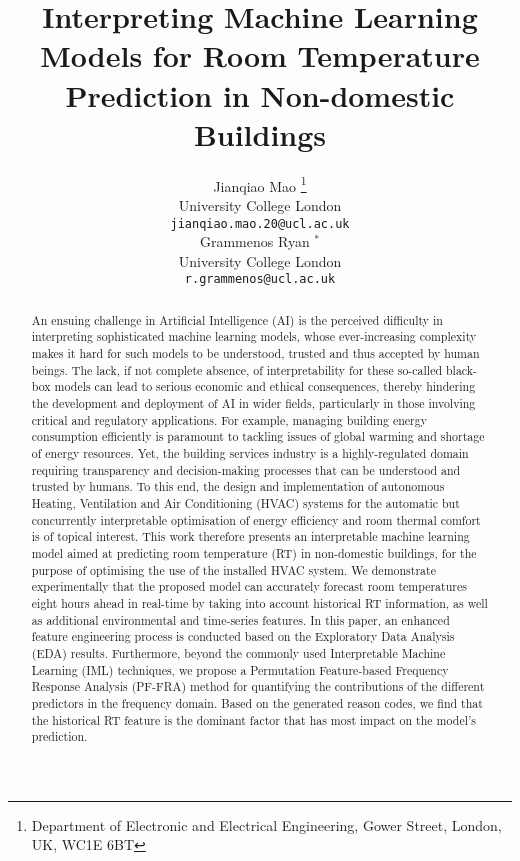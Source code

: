 \documentclass[11pt]{article}
\title{Interpreting Machine Learning Models for Room Temperature Prediction in Non-domestic Buildings}
\author{ {Jianqiao Mao} 
        \thanks{Department of Electronic and Electrical Engineering, Gower Street, London, UK, WC1E 6BT} \\
	University College London \\
	\texttt{jianqiao.mao.20@ucl.ac.uk} \\
	\And
    {Grammenos Ryan $^*$} \\
	University College London\\
	\texttt{r.grammenos@ucl.ac.uk} \\
}
\date{}
\begin{document}
\maketitle

\begin{abstract}
An ensuing challenge in Artificial Intelligence (AI) is the perceived difficulty in interpreting sophisticated machine learning models, whose ever-increasing complexity makes it hard for such models to be understood, trusted and thus accepted by human beings. The lack, if not complete absence, of interpretability for these so-called black-box models can lead to serious economic and ethical consequences, thereby hindering the development and deployment of AI in wider fields, particularly in those involving critical and regulatory applications. For example, managing building energy consumption efficiently is paramount to tackling issues of global warming and shortage of energy resources. Yet, the building services industry is a highly-regulated domain requiring transparency and decision-making processes that can be understood and trusted by humans. To this end, the design and implementation of autonomous Heating, Ventilation and Air Conditioning (HVAC) systems for the automatic but concurrently interpretable optimisation of energy efficiency and room thermal comfort is of topical interest. This work therefore presents an interpretable machine learning model aimed at predicting room temperature (RT) in non-domestic buildings, for the purpose of optimising the use of the installed HVAC system. We demonstrate experimentally that the proposed model can accurately forecast room temperatures eight hours ahead in real-time by taking into account historical RT information, as well as additional environmental and time-series features. In this paper, an enhanced feature engineering process is conducted based on the Exploratory Data Analysis (EDA) results. Furthermore, beyond the commonly used Interpretable Machine Learning (IML) techniques, we propose a Permutation Feature-based Frequency Response Analysis (PF-FRA) method for quantifying the contributions of the different predictors in the frequency domain. Based on the generated reason codes, we find that the historical RT feature is the dominant factor that has most impact on the model’s prediction.
\end{abstract}


\end{document}
